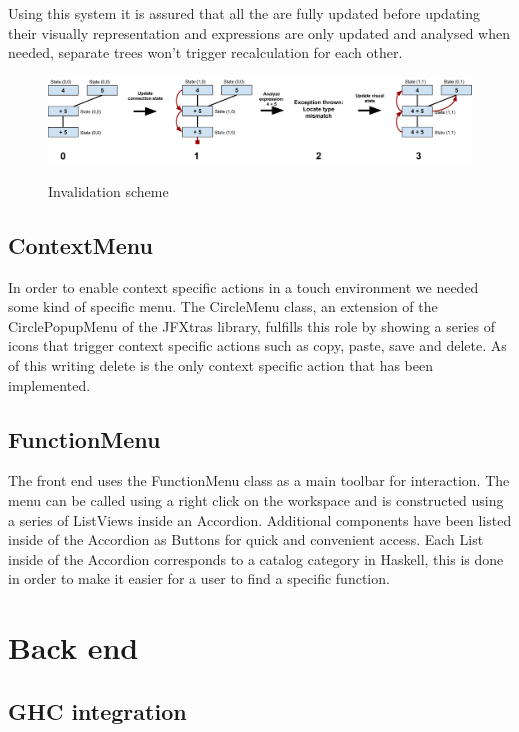 Using this system it is assured that all the  are fully updated before updating their visually representation and expressions are only updated and analysed when needed, separate trees won't trigger recalculation for each other.

\begin{figure}[h]
	\centering
	\includegraphics[scale=0.23]{Images/invalidation}
	\label{fig:invalidation}
	\caption{Invalidation scheme}
\end{figure}

\subsection{ContextMenu}

In order to enable context specific actions in a touch environment we needed some kind of specific menu.
The CircleMenu class, an extension of the CirclePopupMenu of the JFXtras library, fulfills this role by showing a series of icons that trigger context specific actions such as copy, paste, save and delete.
As of this writing delete is the only context specific action that has been implemented.

\subsection{FunctionMenu}

The front end uses the FunctionMenu class as a main toolbar for interaction.
The menu can be called using a right click on the workspace and is constructed using a series of ListViews inside an Accordion.
Additional components have been listed inside of the Accordion as Buttons for quick and convenient access.
Each List inside of the Accordion corresponds to a catalog category in Haskell, this is done in order to make it easier for a user
to find a specific function.

\section{Back end}

\subsection{GHC integration}

